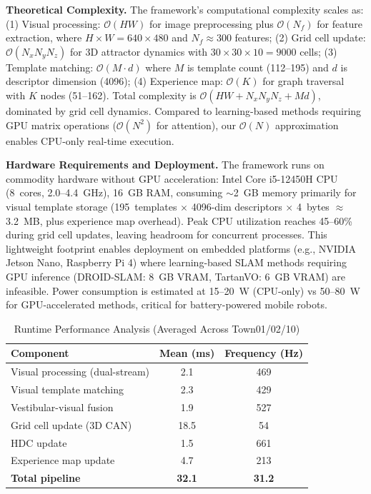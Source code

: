 \textbf{Theoretical Complexity.} The framework's computational complexity scales as: (1) Visual processing: $\mathcal{O}(HW)$ for image preprocessing plus $\mathcal{O}(N_f)$ for feature extraction, where $H \times W = 640 \times 480$ and $N_f \approx 300$ features; (2) Grid cell update: $\mathcal{O}(N_x N_y N_z)$ for 3D attractor dynamics with $30 \times 30 \times 10 = 9000$ cells; (3) Template matching: $\mathcal{O}(M \cdot d)$ where $M$ is template count (112--195) and $d$ is descriptor dimension (4096); (4) Experience map: $\mathcal{O}(K)$ for graph traversal with $K$ nodes (51--162). Total complexity is $\mathcal{O}(HW + N_x N_y N_z + Md)$, dominated by grid cell dynamics. Compared to learning-based methods requiring GPU matrix operations ($\mathcal{O}(N^2)$ for attention), our $\mathcal{O}(N)$ approximation enables CPU-only real-time execution.

\textbf{Hardware Requirements and Deployment.} The framework runs on commodity hardware without GPU acceleration: Intel Core i5-12450H CPU (8~cores, 2.0--4.4~GHz), 16~GB RAM, consuming $\sim$2~GB memory primarily for visual template storage (195~templates $\times$ 4096-dim descriptors $\times$ 4~bytes $\approx$ 3.2~MB, plus experience map overhead). Peak CPU utilization reaches 45--60\% during grid cell updates, leaving headroom for concurrent processes. This lightweight footprint enables deployment on embedded platforms (e.g., NVIDIA Jetson Nano, Raspberry Pi 4) where learning-based SLAM methods requiring GPU inference (DROID-SLAM: 8~GB VRAM, TartanVO: 6~GB VRAM) are infeasible. Power consumption is estimated at 15--20~W (CPU-only) vs 50--80~W for GPU-accelerated methods, critical for battery-powered mobile robots.

\begin{table}[!t]
    \centering
    \setlength{\tabcolsep}{3pt}
    \footnotesize
    \caption{Runtime Performance Analysis (Averaged Across Town01/02/10)}
    \label{tab:runtime}
    \begin{tabular}{lcc}
        \toprule
        Component                       & Mean (ms)     & Frequency (Hz) \\
        \midrule
        Visual processing (dual-stream) & 2.1           & 469            \\
        Visual template matching        & 2.3           & 429            \\
        Vestibular-visual fusion        & 1.9           & 527            \\
        Grid cell update (3D CAN)       & 18.5          & 54             \\
        HDC update                      & 1.5           & 661            \\
        Experience map update           & 4.7           & 213            \\
        \midrule
        \textbf{Total pipeline}         & \textbf{32.1} & \textbf{31.2}  \\
        \bottomrule
    \end{tabular}
\end{table}

